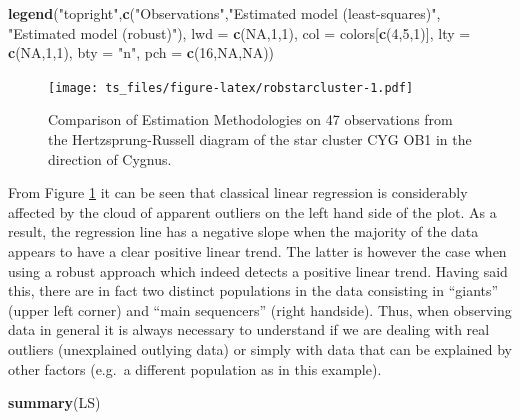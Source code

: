 \documentclass[]{book}
\newenvironment{Shaded}{\begin{snugshade}}{\end{snugshade}}
\newcommand{\KeywordTok}[1]{\textcolor[rgb]{0.13,0.29,0.53}{\textbf{#1}}}
\newcommand{\DataTypeTok}[1]{\textcolor[rgb]{0.13,0.29,0.53}{#1}}
\newcommand{\DecValTok}[1]{\textcolor[rgb]{0.00,0.00,0.81}{#1}}
\newcommand{\StringTok}[1]{\textcolor[rgb]{0.31,0.60,0.02}{#1}}
\newcommand{\OtherTok}[1]{\textcolor[rgb]{0.56,0.35,0.01}{#1}}
\newcommand{\NormalTok}[1]{#1}
\theoremstyle{definition}
\theoremstyle{definition}
\theoremstyle{definition}
\theoremstyle{remark}
\begin{document}
\begin{Shaded}
\begin{Highlighting}[]
\KeywordTok{legend}\NormalTok{(}\StringTok{"topright"}\NormalTok{,}\KeywordTok{c}\NormalTok{(}\StringTok{"Observations"}\NormalTok{,}\StringTok{"Estimated model (least-squares)"}\NormalTok{,}
                    \StringTok{"Estimated model (robust)"}\NormalTok{), }\DataTypeTok{lwd =} \KeywordTok{c}\NormalTok{(}\OtherTok{NA}\NormalTok{,}\DecValTok{1}\NormalTok{,}\DecValTok{1}\NormalTok{), }
       \DataTypeTok{col =}\NormalTok{ colors[}\KeywordTok{c}\NormalTok{(}\DecValTok{4}\NormalTok{,}\DecValTok{5}\NormalTok{,}\DecValTok{1}\NormalTok{)], }\DataTypeTok{lty =} \KeywordTok{c}\NormalTok{(}\OtherTok{NA}\NormalTok{,}\DecValTok{1}\NormalTok{,}\DecValTok{1}\NormalTok{), }
       \DataTypeTok{bty =} \StringTok{"n"}\NormalTok{, }\DataTypeTok{pch =} \KeywordTok{c}\NormalTok{(}\DecValTok{16}\NormalTok{,}\OtherTok{NA}\NormalTok{,}\OtherTok{NA}\NormalTok{))}
\end{Highlighting}
\end{Shaded}

\begin{figure}
\centering
\texttt{[image: ts\_files/figure-latex/robstarcluster-1.pdf]}
\caption{\label{fig:robstarcluster}Comparison of Estimation Methodologies on
47 observations from the Hertzsprung-Russell diagram of the star cluster
CYG OB1 in the direction of Cygnus.}
\end{figure}

From Figure \ref{fig:robstarcluster} it can be seen that classical
linear regression is considerably affected by the cloud of apparent
outliers on the left hand side of the plot. As a result, the regression
line has a negative slope when the majority of the data appears to have
a clear positive linear trend. The latter is however the case when using
a robust approach which indeed detects a positive linear trend. Having
said this, there are in fact two distinct populations in the data
consisting in ``giants'' (upper left corner) and ``main sequencers''
(right handside). Thus, when observing data in general it is always
necessary to understand if we are dealing with real outliers
(unexplained outlying data) or simply with data that can be explained by
other factors (e.g.~a different population as in this example).

\begin{Shaded}
\begin{Highlighting}[]
\KeywordTok{summary}\NormalTok{(LS)}
\end{Highlighting}
\end{Shaded}
\end{document}
